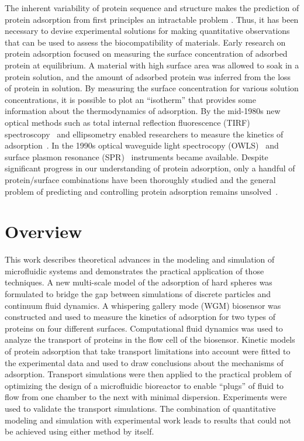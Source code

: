 The inherent variability of protein sequence and structure makes the
prediction of protein adsorption from first principles an intractable
problem \cite{Wilson2004}. Thus, it has been necessary to devise
experimental solutions for making quantitative observations that can
be used to assess the biocompatibility of materials. Early research
on protein adsorption focused on measuring the surface concentration
of adsorbed protein at equilibrium. A material with high surface area
was allowed to soak in a protein solution, and the amount of adsorbed
protein was inferred from the loss of protein in solution. By measuring
the surface concentration for various solution concentrations, it
is possible to plot an {}``isotherm'' that provides some information
about the thermodynamics of adsorption. By the mid-1980s new optical
methods such as total internal reflection fluorescence (TIRF) spectroscopy~\cite{Axelrod1983}
and ellipsometry enabled researchers to measure the kinetics of adsorption~\cite{Andrade1986}.
In the 1990s optical waveguide light spectrocopy (OWLS)~\cite{Kurrat1997}
and surface plasmon resonance (SPR)~\cite{Mrksich1995} instruments
became available. Despite significant progress in our understanding
of protein adsorption, only a handful of protein/surface combinations
have been thoroughly studied and the general problem of predicting
and controlling protein adsorption remains unsolved~\cite{Rabe2010,Gray2004}.


\section{Overview}

This work describes theoretical advances in the modeling and simulation
of microfluidic systems and demonstrates the practical application
of those techniques. A new multi-scale model of the adsorption of
hard spheres was formulated to bridge the gap between simulations
of discrete particles and continuum fluid dynamics. A whispering gallery
mode (WGM) biosensor was constructed and used to measure the kinetics
of adsorption for two types of proteins on four different surfaces.
Computational fluid dynamics was used to analyze the transport of
proteins in the flow cell of the biosensor. Kinetic models of protein
adsorption that take transport limitations into account were fitted
to the experimental data and used to draw conclusions about the mechanisms
of adsorption. Transport simulations were then applied to the practical
problem of optimizing the design of a microfluidic bioreactor to enable
{}``plugs'' of fluid to flow from one chamber to the next with minimal
dispersion. Experiments were used to validate the transport simulations.
The combination of quantitative modeling and simulation with experimental
work leads to results that could not be achieved using either method
by itself.
